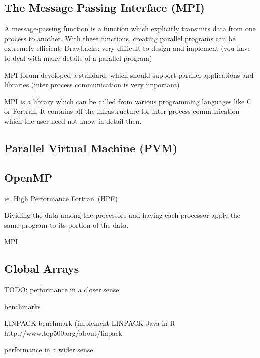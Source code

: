 \subsection{The Message Passing Interface (MPI)}
\label{MPI}



A message-passing function is a function which explicitly transmits
data from one process to another. With these
functions, creating parallel programs can be extremely efficient.
Drawbacks: very difficult to design and implement (you have to deal
with many details of a parallel program)

MPI forum developed a standard, which should support parallel
applications and libraries (inter process communication is very
important)

MPI is a library which can be called from various programming
languages like C or Fortran. It contains all the infrastructure for
inter process communication which the user need not know in detail
then. 


\subsection{Parallel Virtual Machine (PVM)}
\label{PVM}

\subsection{OpenMP}
\label{OpenMP}


ie. High Performance Fortran~(HPF)

Dividing the data among the processors and having each processor apply
the same program to its portion of the data.

MPI

\subsection{Global Arrays}
\label{globalArrays}


TODO: performance in a closer sense

      benchmarks

      LINPACK benchmark (implement LINPACK Java in R
      http://www.top500.org/about/linpack

      performance in a wider sense
